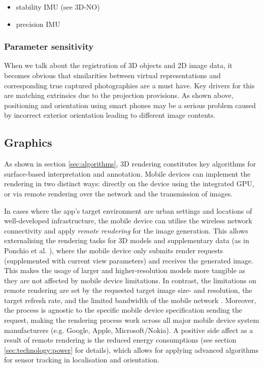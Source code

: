 \documentclass[review]{elsarticle}
\begin{document}
\begin{itemize}
\item stability IMU (see 3D-NO)
\item precision IMU
\end{itemize}

\subsubsection{Parameter sensitivity}
\label{sec:technology:sensors:sensitivity}
When we talk about the registration of 3D objects and 2D image data, it becomes obvious that similarities between virtual representations and corresponding true captured photographies are a must have. Key drivers for this are matching extrinsics due to the projection provisions. As shown above, positioning and orientation using smart phones may be a serious problem caused by incorrect exterior orientation leading to different image contents. 


\subsection{Graphics}
\label{sec:technology:graphics}

As shown in section \ref{sec:algorithms}, 3D rendering constitutes key algorithms for surface-based interpretation and annotation. Mobile devices can implement the rendering in two distinct ways: directly on the device using the integrated \gls{GPU}, or via remote rendering over the network and the transmission of images.

In cases where the app's target environment are urban settings and locations of well-developed infrastructure, the mobile device can utilise the wireless network connectivity and apply \textit{remote rendering} for the image generation. This allows externalising the rendering tasks for 3D models and supplementary data (as in Ponchio et al. \cite{Ponchio2016}), where the mobile device only submits render requests (supplemented with current view parameters) and receives the generated image. This makes the usage of larger and higher-resolution models more tangible as they are not affected by mobile device limitations. In contrast, the limitations on remote rendering are set by the requested target image size- and resolution, the target refresh rate, and the limited bandwidth of the mobile network \cite{Ponchio2016,Evans2014}. Moreover, the process is agnostic to the specific mobile device specification sending the request, making the rendering process work across all major mobile device system manufacturers (e.g. Google, Apple, Microsoft/Nokia). A positive side affect as a result of remote rendering is the reduced energy consumptions (see section \ref{sec:technology:power} for details), which allows for applying advanced algorithms for sensor tracking in localisation and orientation.
\end{document}
